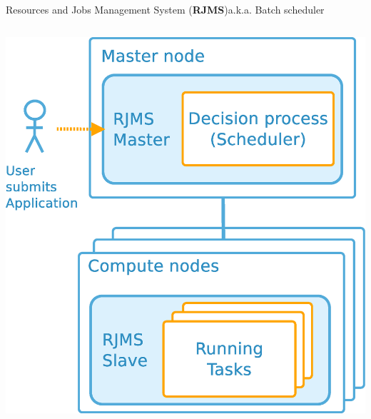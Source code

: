 \documentclass[10pt, compress, titleprogressbar, aspectratio=169]{beamer}
\begin{document}
\begin{frame}{Resources and Jobs Management System (\textbf{RJMS})}{a.k.a.
            Batch scheduler}
\begin{columns}
\begin{column}{0.4\textwidth}
\begin{center}
                        \includegraphics[width=\linewidth,height=\textheight,keepaspectratio]{./img/rjms_overview.eps}
                    \end{center}
                \end{column}
            \end{columns}
        \end{frame}
\end{document}
